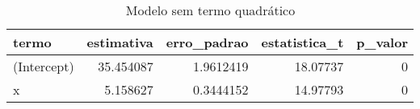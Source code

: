 \begin{table}

\caption{\label{tab:tabela1_exemplo4}Modelo sem termo quadrático}
\centering
\begin{tabular}[t]{l|r|r|r|r}
\hline
termo & estimativa & erro\_padrao & estatistica\_t & p\_valor\\
\hline
(Intercept) & 35.454087 & 1.9612419 & 18.07737 & 0\\
\hline
x & 5.158627 & 0.3444152 & 14.97793 & 0\\
\hline
\end{tabular}
\end{table}

